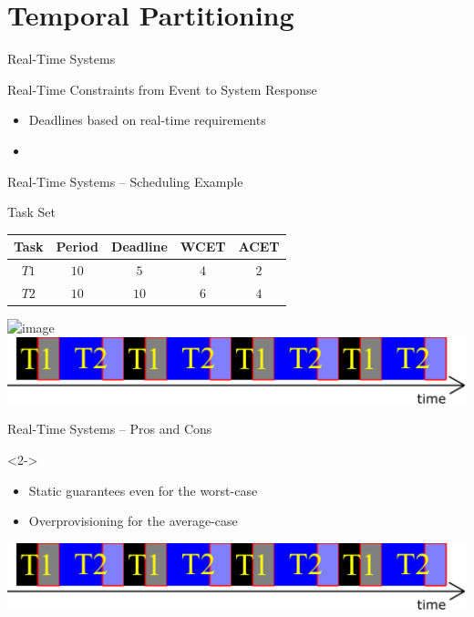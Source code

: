 \section{Temporal Partitioning}


\begin{frame}{Real-Time Systems}

\begin{block}{Real-Time Constraints from Event to System Response}
\pause
\begin{itemize}[<+->]
    \item Deadlines based on real-time requirements
    \item 
\end{itemize}
\end{block}

\end{frame}


\begin{frame}{Real-Time Systems -- Scheduling Example}

\begin{block}{Task Set}
\begin{tabular}{cccc<{\onslide<3->}c<{\onslide}}
\textbf{Task}&\textbf{Period}&\textbf{Deadline}&\textbf{WCET}&\textbf{ACET}\\ \hline
$T1$&$10$&$5$&$4$&$2$\\
$T2$&$10$&$10$&$6$&$4$\\
\end{tabular}
\end{block}

\vfill

\includegraphics<2-3>[width=\textwidth]{Figures/real-time-sched-1}
\includegraphics<4>[width=\textwidth]{Figures/real-time-sched-2}

\end{frame}

\begin{frame}{Real-Time Systems -- Pros and Cons}

\begin{block}{}<2->
    \begin{itemize}
        \item<2-> Static guarantees even for the worst-case
        \item<3-> Overprovisioning for the average-case 
    \end{itemize}
\end{block}

\vfill

\includegraphics[width=\textwidth]{Figures/real-time-sched-2}


\end{frame}


